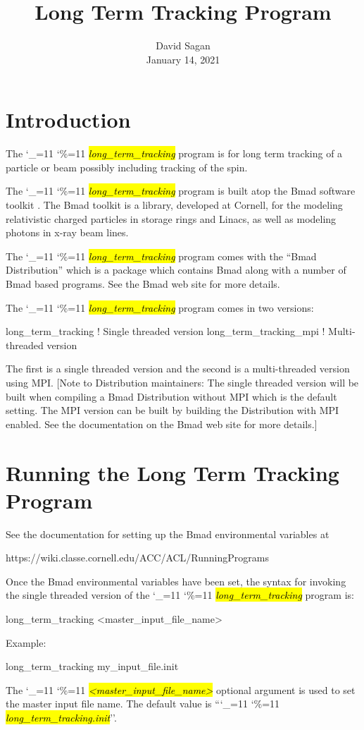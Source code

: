 \documentclass{hitec}
\title{Long Term Tracking Program}
\author{}
\date{David Sagan \\ January 14, 2021}
\newcommand\dottcmd[1]{\hl{\em#1}\endgroup}
\newcommand{\vn}{\begingroup\catcode`\_=11 \catcode`\%=11 \dottcmd}
\newcommand{\ltt}{\vn{long_term_tracking}\xspace}
\newcommand{\Section}[1]{\section{#1}\vspace*{-1ex}}
\begin{document}
\maketitle

\tableofcontents


\Section{Introduction} 

The \ltt program is for long term tracking of a particle or beam possibly including tracking of the
spin.

The \ltt program is built atop the Bmad software toolkit \cite{b:bmad}. The Bmad toolkit is a
library, developed at Cornell, for the modeling relativistic charged particles in storage rings and
Linacs, as well as modeling photons in x-ray beam lines.

The \ltt program comes with the ``Bmad Distribution'' which is a package which contains Bmad along with
a number of Bmad based programs. See the Bmad web site for more details.

The \ltt program comes in two versions: 
\begin{code}
long_term_tracking      ! Single threaded version
long_term_tracking_mpi  ! Multi-threaded version
\end{code}
The first is a single threaded version and the second is a multi-threaded version using MPI.  [Note
to Distribution maintainers: The single threaded version will be built when compiling a Bmad
Distribution without MPI which is the default setting. The MPI version can be built by building the
Distribution with MPI enabled. See the documentation on the Bmad web site for more details.]

\Section{Running the Long Term Tracking Program} 
\label{s:run}

See the documentation for setting up the Bmad environmental variables at
\begin{code}
  https://wiki.classe.cornell.edu/ACC/ACL/RunningPrograms
\end{code}

Once the Bmad environmental variables have been set, the syntax for invoking the single threaded
version of the \ltt program is:
\begin{code}
  long_term_tracking {<master_input_file_name>}
\end{code}
Example:
\begin{code}
  long_term_tracking my_input_file.init
\end{code}
The \vn{<master_input_file_name>} optional argument is used to set the master input file name. The
default value is ``\vn{long_term_tracking.init}''. 
\end{document}
